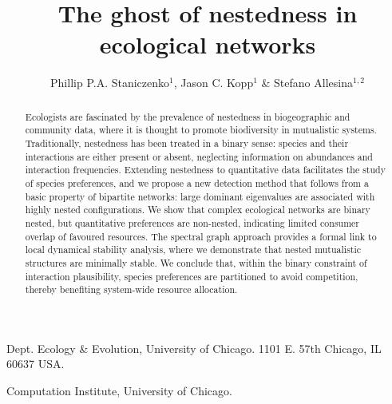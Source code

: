\documentclass[pdftex]{nature}
\title{The ghost of nestedness in ecological networks}
\author{Phillip P.A. Staniczenko$^{1}$, Jason C. Kopp$^{1}$ \& Stefano
  Allesina$^{1,2}$}
\begin{document}
\linenumbers
\maketitle

\begin{affiliations}
{\small
 \item {Dept. Ecology \& Evolution, University of Chicago. 1101
   E. 57th Chicago, IL 60637 USA.}
 \item {Computation Institute, University of Chicago.}
}
\end{affiliations}

\begin{abstract}
Ecologists are fascinated by the prevalence of nestedness in
biogeographic and community data, where it is thought to promote
biodiversity in mutualistic systems.  Traditionally, nestedness has
been treated in a binary sense: species and their interactions are
either present or absent, neglecting information on abundances and
interaction frequencies.  Extending nestedness to quantitative data
facilitates the study of species preferences, and we propose a new
detection method that follows from a basic property of bipartite
networks: large dominant eigenvalues are associated with highly nested
configurations.  We show that complex ecological networks are binary
nested, but quantitative preferences are non-nested, indicating
limited consumer overlap of favoured resources.  The spectral graph
approach provides a formal link to local dynamical stability analysis,
where we demonstrate that nested mutualistic structures are minimally
stable.  We conclude that, within the binary constraint of interaction
plausibility, species preferences are partitioned to avoid
competition, thereby benefiting system-wide resource allocation.
\end{abstract}
\end{document}

